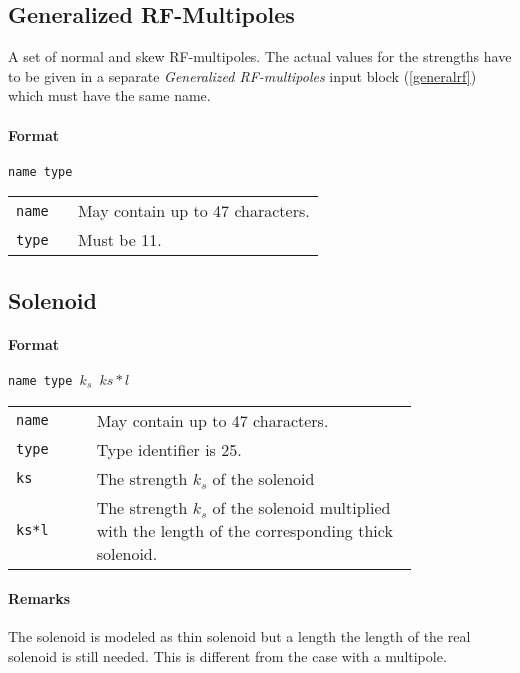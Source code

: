 \subsection{Generalized RF-Multipoles} \label{rfmulbloc}

A set of normal and skew RF-multipoles.
The actual values for the strengths have to be given in a separate \textit{Generalized RF-multipoles} input block (\ref{generalrf}) which must have the same name.

\paragraph{Format} \texttt{name type }


    \begin{tabular}{@{}lp{0.8\linewidth}}
        \texttt{name} & May contain up to 47 characters. \\
        \texttt{type} & Must be 11. \\
    \end{tabular}



\subsection{Solenoid} \label{Solenoid}

\paragraph{Format} \texttt{name type $k_s$ $ks*l$}

\bigskip
\begin{tabular}{@{}lp{0.8\linewidth}}
    \texttt{name} & May contain up to 47 characters. \\
    \texttt{type} & Type identifier is 25. \\
    \texttt{ks}   & The strength $k_s$ of the solenoid \\
    \texttt{ks*l} & The strength $k_s$ of the solenoid multiplied with the length of the corresponding thick solenoid. \\
\end{tabular}

\paragraph{Remarks}
The solenoid is modeled as thin solenoid but a length the length of the real solenoid is still needed. This is different from the case with a multipole.


